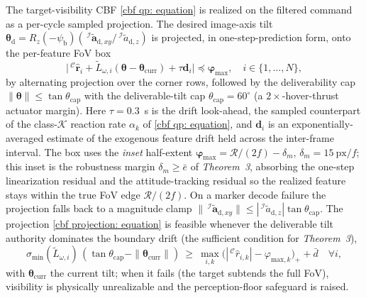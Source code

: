 \documentclass{IEEEtaes}
\begin{document}
The target-visibility CBF \eqref{cbf qp: equation} is realized on the filtered command as a per-cycle sampled projection. The desired image-axis tilt $\boldsymbol{\theta}_\text{d}=R_z(-\psi_\text{b})(\,^\mathcal{I}\tilde{\boldsymbol{a}}_{\text{d},xy}/\,^\mathcal{I}\tilde{a}_{\text{d},z})$ is projected, in one-step-prediction form, onto the per-feature FoV box
\begin{equation} \label{cbf projection: equation}
    \big|\,^\mathcal{C}\hat{\boldsymbol{r}}_i+\tilde{L}_{\omega,i}(\boldsymbol{\theta}-\boldsymbol{\theta}_\text{curr})+\tau\boldsymbol{d}_i\big|\preceq\boldsymbol{\varphi}_\text{max},\quad i\in\{1,\ldots,N\},
\end{equation}
by alternating projection over the corner rows, followed by the deliverability cap $\|\boldsymbol{\theta}\|\le\tan\theta_\text{cap}$ with the deliverable-tilt cap $\theta_\text{cap}=60^\circ$ (a $2\times$-hover-thrust actuator margin). Here $\tau=0.3$~s is the drift look-ahead, the sampled counterpart of the class-$\mathcal{K}$ reaction rate $\alpha_k$ of \eqref{cbf qp: equation}, and $\boldsymbol{d}_i$ is an exponentially-averaged estimate of the exogenous feature drift held across the inter-frame interval. The box uses the \emph{inset} half-extent $\boldsymbol{\varphi}_\text{max}=\mathcal{R}/(2f)-\delta_m$, $\delta_m=15~\text{px}/f$; this inset is the robustness margin $\delta_m\ge\bar{e}$ of \textit{Theorem~3}, absorbing the one-step linearization residual and the attitude-tracking residual so the realized feature stays within the true FoV edge $\mathcal{R}/(2f)$. On a marker decode failure the projection falls back to a magnitude clamp $\|\,^\mathcal{I}\tilde{\boldsymbol{a}}_{\text{d},xy}\|\le|\,^\mathcal{I}\tilde{a}_{\text{d},z}|\tan\theta_\text{cap}$. The projection \eqref{cbf projection: equation} is feasible whenever the deliverable tilt authority dominates the boundary drift (the sufficient condition for \textit{Theorem~3}),
\begin{equation} \label{cbf feasibility: equation}
    \sigma_{\min}(\tilde{L}_{\omega,i})\,(\tan\theta_\text{cap}-\|\boldsymbol{\theta}_\text{curr}\|)\ \ge\ \max_{i,k}\big(|\,^\mathcal{C}\hat{r}_{i,k}|-\varphi_{\text{max},k}\big)_+ + \bar{d}\quad\forall i,
\end{equation}
with $\boldsymbol{\theta}_\text{curr}$ the current tilt; when it fails (the target subtends the full FoV), visibility is physically unrealizable and the perception-floor safeguard is raised.
\end{document}
